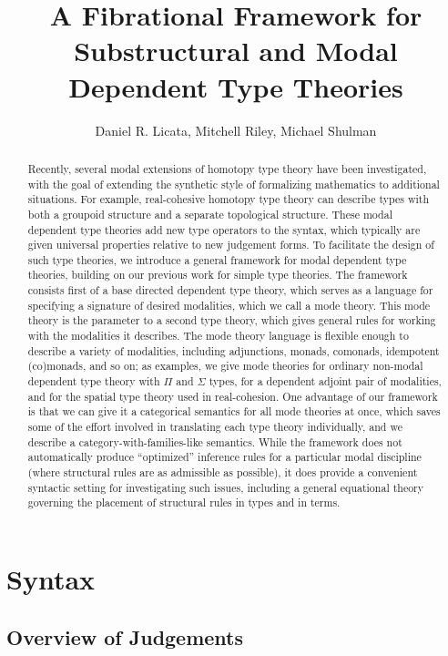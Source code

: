 \documentclass[10pt]{article}
\title{A Fibrational Framework for \\ Substructural and Modal Dependent Type Theories}
\author{Daniel R. Licata, Mitchell Riley, Michael Shulman}
\date{}
\theoremstyle{definition}
\begin{document}
\maketitle
\tableofcontents

\begin{abstract}
Recently, several modal extensions of homotopy type theory have been
investigated, with the goal of extending the synthetic style of
formalizing mathematics to additional situations.  For example,
real-cohesive homotopy type theory can describe types with both a
groupoid structure and a separate topological structure.  These modal
dependent type theories add new type operators to the syntax, which
typically are given universal properties relative to new judgement
forms.  To facilitate the design of such type theories, we introduce a
general framework for modal dependent type theories, building on our
previous work for simple type theories.  The framework consists first of
a base directed dependent type theory, which serves as a language for
specifying a signature of desired modalities, which we call a mode
theory.  This mode theory is the parameter to a second type theory,
which gives general rules for working with the modalities it describes.
The mode theory language is flexible enough to describe a variety of
modalities, including adjunctions, monads, comonads, idempotent
(co)monads, and so on; as examples, we give mode theories for ordinary
non-modal dependent type theory with $\Pi$ and $\Sigma$ types, for a
dependent adjoint pair of modalities, and for the spatial type theory
used in real-cohesion.  One advantage of our framework is that we can
give it a categorical semantics for all mode theories at once, which
saves some of the effort involved in translating each type theory
individually, and we describe a category-with-families-like semantics.
While the framework does not automatically produce ``optimized''
inference rules for a particular modal discipline (where structural
rules are as admissible as possible), it does provide a convenient
syntactic setting for investigating such issues, including a general
equational theory governing the placement of structural rules in types
and in terms.
\end{abstract}

\section{Syntax}

\subsection{Overview of Judgements}
\end{document}
